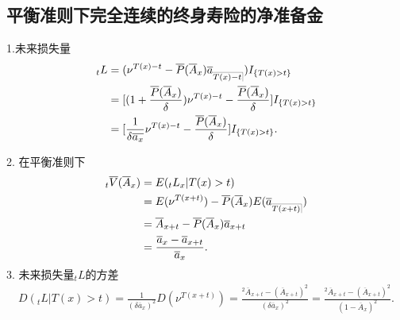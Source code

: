 \documentclass[lang=cn,10pt]{elegantbook}
\makeatletter
\DeclareRobustCommand{\annu}[1]{_{%
    \def\arraystretch{0}%
    \setlength\arraycolsep{1pt}%
    \setlength\arrayrulewidth{.2pt}%
    \begin{array}[b]{@{}c|}\hline
        \\[\arraycolsep]%
        \scriptstyle #1%
    \end{array}%
}}
\makeatother
\begin{document}
\subsection{平衡准则下完全连续的终身寿险的净准备金}
\begin{proposition}
    1.未来损失量
\begin{align*}
    {}_tL&=(\nu^{T(x)-t}-\overline{P}( \overline{A}_x )\overline a_{\annu {T(x)-t}})I_{\{T(x)>t\}} \\
                        &= [(1+\frac{\overline{P}( \overline{A}_x )}{\delta})\nu^{T(x)-t}-\frac{\overline{P}( \overline{A}_x )}{\delta} ] I_{\{T(x)>t\}}\\
                        &= [\frac{1}{\delta\overline{a_x}}\nu^{T(x)-t}-\frac{\overline{P}( \overline{A}_x )}{\delta} ]I_{\{T(x)>t\}}.
\end{align*}

2. 在平衡准则下
\begin{align*}
    {}_t\overline V(\overline A_x)&=E({}_tL_x|T(x)>t) \\
                        &=E(\nu^{T(x+t)})-\overline{P}( \overline{A}_x )E(\overline a_{\annu {T(x+t)}})\\
                        &=\overline A_{x+t}-\overline{P}( \overline{A}_x )\overline a_{x+t}\\
                        &=\frac{\overline a_x-\overline a_{x+t}}{\overline a_x}.
\end{align*}
3. 未来损失量$_tL$的方差
\begin{align*}
    D(_tL|T(x)>t) =\frac{1}{(\delta\overline a_x)^2}D(\nu^{T(x+t)})=\frac{^2\overline A_{x+t}-(\overline A_{x+t})^2}{(\delta\overline a_x)^2}=\frac{^2\overline A_{x+t}-(\overline A_{x+t})^2}{(1-\overline{A}_x)^2}. 
\end{align*}
\end{proposition}
\end{document}

